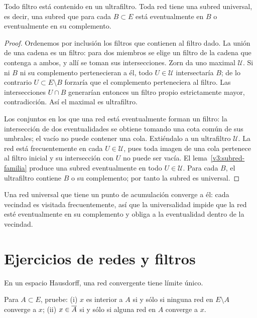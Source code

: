 \begin{lema}\label{v3:ultrafiltro-existencia}
Todo filtro está contenido en un ultrafiltro. Toda red tiene una subred universal, es decir, una subred que para cada $B\subset E$ está eventualmente en $B$ o eventualmente en su complemento.
\end{lema}
\begin{proof}
Ordenemos por inclusión los filtros que contienen al filtro dado. La unión de una cadena es un filtro: para dos miembros se elige un filtro de la cadena que contenga a ambos, y allí se toman sus intersecciones. Zorn da uno maximal $\mathcal U$. Si ni $B$ ni su complemento pertenecieran a él, todo $U\in\mathcal U$ intersectaría $B$; de lo contrario $U\subset E\setminus B$ forzaría que el complemento perteneciera al filtro. Las intersecciones $U\cap B$ generarían entonces un filtro propio estrictamente mayor, contradicción. Así el maximal es ultrafiltro.

Los conjuntos en los que una red está eventualmente forman un filtro: la intersección de dos eventualidades se obtiene tomando una cota común de sus umbrales; el vacío no puede contener una cola. Extiéndalo a un ultrafiltro $\mathcal U$. La red está frecuentemente en cada $U\in\mathcal U$, pues toda imagen de una cola pertenece al filtro inicial y su intersección con $U$ no puede ser vacía. El lema~\ref{v3:subred-familia} produce una subred eventualmente en todo $U\in\mathcal U$. Para cada $B$, el ultrafiltro contiene $B$ o su complemento; por tanto la subred es universal.
\end{proof}
Una red universal que tiene un punto de acumulación converge a él: cada vecindad es visitada frecuentemente, así que la universalidad impide que la red esté eventualmente en su complemento y obliga a la eventualidad dentro de la vecindad.

\section{Ejercicios de redes y filtros}
\begin{ejercicio}\label{ej:v3-l14-1}
En un espacio Hausdorff, una red convergente tiene límite único.
\end{ejercicio}


\begin{ejercicio}\label{ej:v3-l14-2}
Para $A\subset E$, pruebe: (i) $x$ es interior a $A$ si y sólo si ninguna red en $E\setminus A$ converge a $x$; (ii) $x\in\overline{A}$ si y sólo si alguna red en $A$ converge a $x$.
\end{ejercicio}


